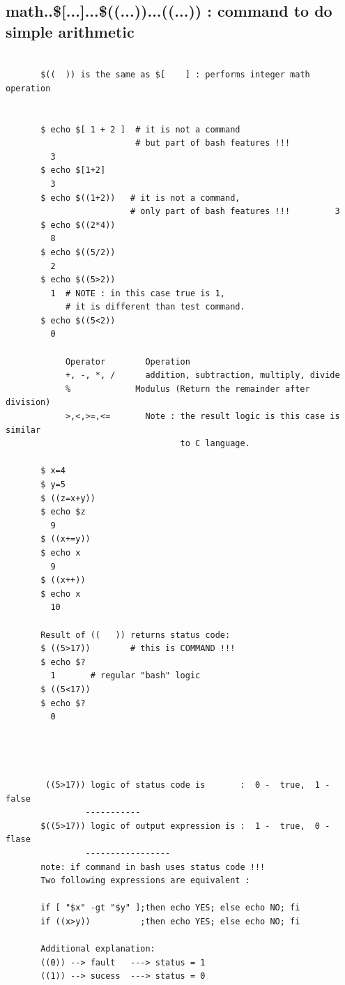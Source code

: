 \documentclass[a4paper,12pt]{article}
\begin{document}
\subsection{math..\$[...]...\$((...))...((...)) : command to do simple arithmetic}
\begin{verbatim}
       
       $((  )) is the same as $[    ] : performs integer math operation
       
       
       $ echo $[ 1 + 2 ]  # it is not a command
                          # but part of bash features !!!
         3
       $ echo $[1+2]
         3
       $ echo $((1+2))   # it is not a command,
                         # only part of bash features !!!         3
       $ echo $((2*4))
         8
       $ echo $((5/2))
         2
       $ echo $((5>2))
         1  # NOTE : in this case true is 1,
            # it is different than test command.                  
       $ echo $((5<2))
         0
  
            Operator	    Operation
            +, -, *, /	    addition, subtraction, multiply, divide
            %	          Modulus (Return the remainder after division)         
            >,<,>=,<=       Note : the result logic is this case is similar
                                   to C language.
             
       $ x=4
       $ y=5                            
       $ ((z=x+y))     
       $ echo $z
         9
       $ ((x+=y))
       $ echo x
         9
       $ ((x++))
       $ echo x
         10  
            
       Result of ((   )) returns status code:
       $ ((5>17))        # this is COMMAND !!!
       $ echo $?
         1       # regular "bash" logic
       $ ((5<17))
       $ echo $?
         0
        
        
         
       
        ((5>17)) logic of status code is       :  0 -  true,  1 - false
                -----------
       $((5>17)) logic of output expression is :  1 -  true,  0 -  flase   
                -----------------  
       note: if command in bash uses status code !!!
       Two following expressions are equivalent : 
       
       if [ "$x" -gt "$y" ];then echo YES; else echo NO; fi
       if ((x>y))          ;then echo YES; else echo NO; fi
       
       Additional explanation:
       ((0)) --> fault   ---> status = 1
       ((1)) --> sucess  ---> status = 0     
       

\end{verbatim}
\end{document}
